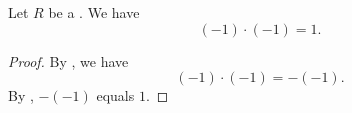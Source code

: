 \begin{corollary} \label{corollary:minus_one_times_minus_one_is_one_in_a_ring}
    Let $R$ be a . We have 
    $$(-1) \cdot (-1) = 1.$$
\end{corollary}
\begin{proof}
    By , we have
    $$(-1) \cdot (-1) = -(-1).$$
    By , $-(-1)$ equals $1$.
\end{proof}